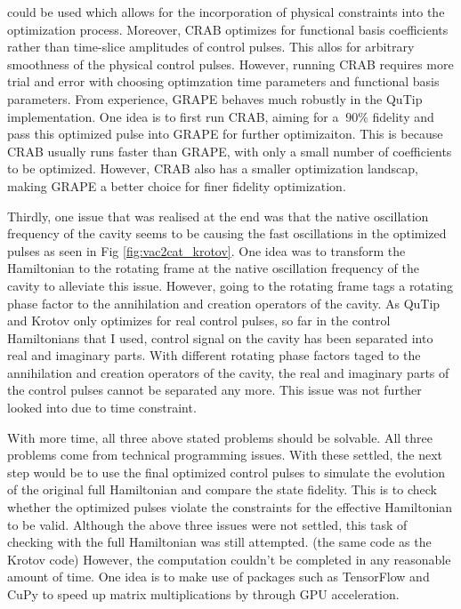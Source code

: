 \documentclass[12pt]{report}
\begin{document}
could be used which allows for the incorporation of physical constraints into the optimization process. Moreover, CRAB optimizes for functional basis coefficients 
rather than time-slice amplitudes of control pulses. This allos for arbitrary smoothness of the physical control pulses.
However, running CRAB requires more trial and error with choosing optimzation time parameters and functional basis parameters. 
From experience, GRAPE behaves much robustly in the QuTip implementation. One idea is to first run CRAB, aiming for a $~90\%$ fidelity and pass this optimized pulse into GRAPE for further optimizaiton. 
This is because CRAB usually runs faster than GRAPE, with only a small number of coefficients to be optimized. However, CRAB also has a smaller optimization landscap, making GRAPE a better choice for finer fidelity optimization. 
\par
Thirdly, one issue that was realised at the end was that the native oscillation frequency of the cavity seems to be causing the fast oscillations in the optimized pulses as seen in Fig \ref{fig:vac2cat_krotov}.
One idea was to transform the Hamiltonian to the rotating frame at the native oscillation frequency of the cavity to alleviate this issue. 
However, going to the rotating frame tags a rotating phase factor to the annihilation and creation operators of the cavity. 
As QuTip and Krotov only optimizes for real control pulses, so far in the control Hamiltonians that I used, control signal on the cavity has been separated into real and imaginary parts. 
With different rotating phase factors taged to the annihilation and creation operators of the cavity, the real and imaginary parts of the control pulses cannot be separated any more. 
This issue was not further looked into due to time constraint. 
\par
With more time, all three above stated problems should be solvable. All three problems come from technical programming issues. 
With these settled, the next step would be to use the final optimized control pulses to simulate the evolution of the original full Hamiltonian and compare the state fidelity. 
This is to check whether the optimized pulses violate the constraints for the effective Hamiltonian to be valid. 
Although the above three issues were not settled, this task of checking with the full Hamiltonian was still attempted. (the same code as the Krotov code)
However, the computation couldn't be completed in any reasonable amount of time. 
One idea is to make use of packages such as TensorFlow and CuPy to speed up matrix multiplications by through GPU acceleration.
\end{document}
